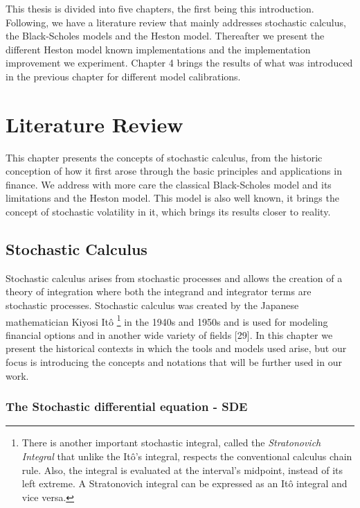 \documentclass[12pt,twoside]{reedthesis}
\theoremstyle{definition}
\theoremstyle{definition}
\theoremstyle{remark}
\begin{document}
  This thesis is divided into five chapters, the first being this
  introduction. Following, we have a literature review that mainly
  addresses stochastic calculus, the Black-Scholes models and the Heston
  model. Thereafter we present the different Heston model known
  implementations and the implementation improvement we experiment.
  Chapter 4 brings the results of what was introduced in the previous
  chapter for different model calibrations.
  
  \chapter{Literature Review}\label{lt-review}
  
  This chapter presents the concepts of stochastic calculus, from the
  historic conception of how it first arose through the basic principles
  and applications in finance. We address with more care the classical
  Black-Scholes model and its limitations and the Heston model. This model
  is also well known, it brings the concept of stochastic volatility in
  it, which brings its results closer to reality.
  
  \section{Stochastic Calculus}\label{stochastic-calculus}
  
  Stochastic calculus arises from stochastic processes and allows the
  creation of a theory of integration where both the integrand and
  integrator terms are stochastic processes. Stochastic calculus was
  created by the Japanese mathematician Kiyosi Itô
  \footnote{There is another important stochastic integral, called the \textit{Stratonovich Integral} that unlike the Itô's integral, respects the conventional calculus chain rule. Also, the integral is evaluated at the interval's midpoint, instead of its left extreme. A Stratonovich integral can be expressed as an Itô integral and vice versa.}
  in the 1940s and 1950s and is used for modeling financial options and in
  another wide variety of fields {[}29{]}. In this chapter we present the
  historical contexts in which the tools and models used arise, but our
  focus is introducing the concepts and notations that will be further
  used in our work.
  
  \subsection{The Stochastic differential equation -
  SDE}\label{the-stochastic-differential-equation---sde}
  
\end{document}

